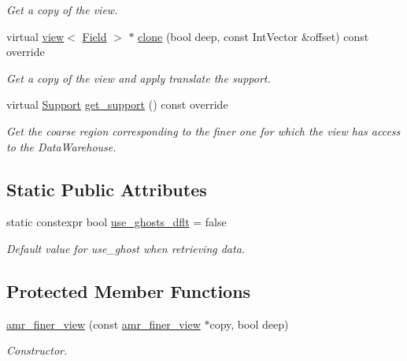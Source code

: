 \begin{DoxyCompactItemize}
\begin{DoxyCompactList}\small\item\em Get a copy of the view. \end{DoxyCompactList}\item 
virtual \hyperlink{classUintah_1_1PhaseField_1_1detail_1_1view}{view}$<$ \hyperlink{structUintah_1_1PhaseField_1_1ScalarField}{Field} $>$ $\ast$ \hyperlink{classUintah_1_1PhaseField_1_1detail_1_1amr__finer__view_3_01ScalarField_3_01T_01_4_00_01Problem_810ae3f886a4d3bdb2b37c629369a2ec_afae4d2b27a016b9f84d795d3e698608f}{clone} (bool deep, const Int\+Vector \&offset) const override
\begin{DoxyCompactList}\small\item\em Get a copy of the view and apply translate the support. \end{DoxyCompactList}\item 
virtual \hyperlink{classUintah_1_1PhaseField_1_1Support}{Support} \hyperlink{classUintah_1_1PhaseField_1_1detail_1_1amr__finer__view_3_01ScalarField_3_01T_01_4_00_01Problem_810ae3f886a4d3bdb2b37c629369a2ec_adfbb25e7253411ffab2a2bc035e87a6b}{get\+\_\+support} () const override
\begin{DoxyCompactList}\small\item\em Get the coarse region corresponding to the finer one for which the view has access to the Data\+Warehouse. \end{DoxyCompactList}\end{DoxyCompactItemize}
\subsection*{Static Public Attributes}
\begin{DoxyCompactItemize}
\item 
static constexpr bool \hyperlink{classUintah_1_1PhaseField_1_1detail_1_1amr__finer__view_3_01ScalarField_3_01T_01_4_00_01Problem_810ae3f886a4d3bdb2b37c629369a2ec_aee5138b1c87ec5e7717b5f1dd6fd47cd}{use\+\_\+ghosts\+\_\+dflt} = false
\begin{DoxyCompactList}\small\item\em Default value for use\+\_\+ghost when retrieving data. \end{DoxyCompactList}\end{DoxyCompactItemize}
\subsection*{Protected Member Functions}
\begin{DoxyCompactItemize}
\item 
\hyperlink{classUintah_1_1PhaseField_1_1detail_1_1amr__finer__view_3_01ScalarField_3_01T_01_4_00_01Problem_810ae3f886a4d3bdb2b37c629369a2ec_a3836d284166d8899b18d17a4f37d1852}{amr\+\_\+finer\+\_\+view} (const \hyperlink{classUintah_1_1PhaseField_1_1detail_1_1amr__finer__view}{amr\+\_\+finer\+\_\+view} $\ast$copy, bool deep)
\begin{DoxyCompactList}\small\item\em Constructor. \end{DoxyCompactList}\end{DoxyCompactItemize}
